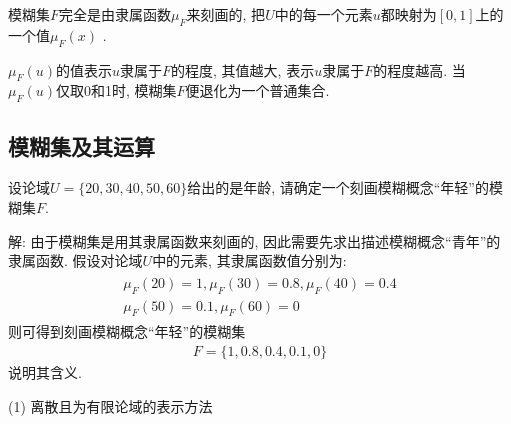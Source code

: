 \begin{remark}
 模糊集$F$完全是由隶属函数$\mu_{F}$来刻画的, 把$U$中的每一个元素$u$都映射为$[0, 1]$上的一个值$\mu_F(x)$ .

 $\mu_F(u)$的值表示$u$隶属于$F$的程度, 其值越大, 表示$u$隶属于$F$的程度越高. 当$\mu_F(u)$仅取0和1时, 模糊集$F$便退化为一个普通集合.
\end{remark}
\subsection{模糊集及其运算}
\begin{example}
  设论域$U=\{20, 30, 40, 50, 60\}$给出的是年龄, 请确定一个刻画模糊概念“年轻”的模糊集$F$.
\end{example}

解: 由于模糊集是用其隶属函数来刻画的, 因此需要先求出描述模糊概念“青年”的隶属函数. 假设对论域$U$中的元素, 其隶属函数值分别为:
\begin{align}
 \begin{array}{l}{\mu_{F}(20)=1, \mu_{F}(30)=0.8, \mu_{F}(40)=0.4} \\ {\mu_{F}(50)=0.1, \mu_{F}(60)=0}\end{array}
\end{align}
则可得到刻画模糊概念“年轻”的模糊集
\begin{align}
  F=\{ 1, 0.8, 0.4, 0.1, 0\}
\end{align}
说明其含义.

(1) 离散且为有限论域的表示方法

